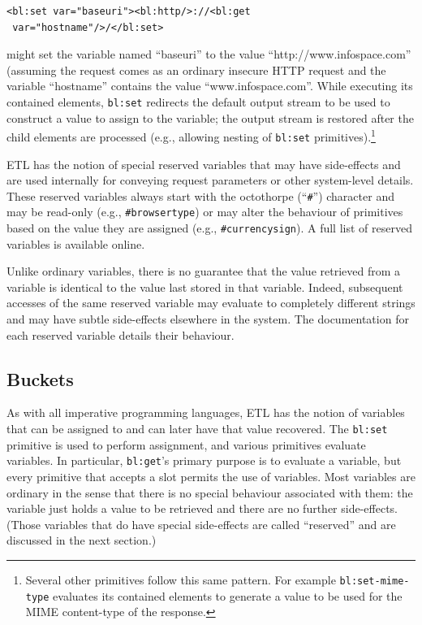 \documentclass{www2003-submission}
\newcommand{\B}{\discretionary{}{}{}}
\newcommand{\smtexttt}[1]{{\small\texttt{#1}}}
\begin{document}
\begin{verbatim}
<bl:set var="baseuri"><bl:http/>://<bl:get
 var="hostname"/>/</bl:set>
\end{verbatim}

\noindent might set the variable named ``baseuri'' to the value
``http://www.\B{}infospace.\B{}com'' (assuming the request comes as an
ordinary insecure HTTP request and the variable ``hostname'' contains
the value ``www.infospace.com''.  While executing its contained
elements, \smtexttt{bl:set} redirects the default output stream to be
used to construct a value to assign to the variable; the output stream
is restored after the child elements are processed (e.g., allowing
nesting of \smtexttt{bl:set} primitives).\footnote{Several other
primitives follow this same pattern.  For example
\smtexttt{bl:set-mime-type} evaluates its contained elements to
generate a value to be used for the MIME content-type of the
response.}

ETL has the notion of special reserved variables that may have
side-effects and are used internally for conveying request parameters or
other system-level details.  These reserved variables always start with
the octothorpe (``\smtexttt{\#}'') character and may be read-only (e.g.,
\smtexttt{\#browsertype}) or may alter the behaviour of primitives based
on the value they are assigned (e.g., \smtexttt{\#currencysign}).  A
full list of reserved variables is available
online.~\cite{etl-reserved-variables}

Unlike ordinary variables, there is no guarantee that the value
retrieved from a variable is identical to the value last stored in that
variable.  Indeed, subsequent accesses of the same reserved
variable may evaluate to completely different strings and may have
subtle side-effects elsewhere in the system.  The documentation for each
reserved variable details their behaviour.

\subsection{Buckets}
\label{ssec-buckets}

As with all imperative programming languages, ETL has the notion of
variables that can be assigned to and can later have that value
recovered.  The \smtexttt{bl:set} primitive is used to perform
assignment, and various primitives evaluate variables. In particular,
\smtexttt{bl:get}'s primary purpose is to evaluate a variable, but
every primitive that accepts a slot permits the use of variables.  Most
variables are ordinary in the sense that there is no special behaviour
associated with them: the variable just holds a value to be retrieved and
there are no further side-effects.  (Those variables that do have special
side-effects are called ``reserved'' and are discussed in the next
section.)
\end{document}
